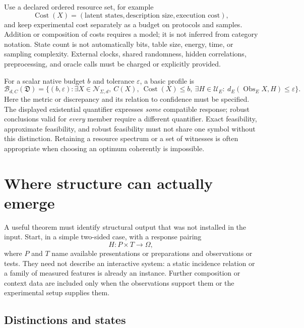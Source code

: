\documentclass[11pt]{article}
\theoremstyle{remark}
\newcommand{\Obs}{\operatorname{Obs}}
\newcommand{\Cost}{\operatorname{Cost}}
\newcommand{\calN}{\mathcal N}
\newcommand{\calU}{\mathcal U}
\begin{document}
Use a declared ordered resource set, for example
\[
 \Cost(X)=(\text{latent states},\text{description size},\text{execution cost}),
\]
and keep experimental cost separately as a budget on protocols and samples. Addition or composition of costs requires a model; it is not inferred from category notation. State count is not automatically bits, table size, energy, time, or sampling complexity. External clocks, shared randomness, hidden correlations, preprocessing, and oracle calls must be charged or explicitly provided.

For a scalar native budget $b$ and tolerance $\varepsilon$, a basic profile is
\begin{equation}
 \mathscr B_{d,C}(\mathfrak D)
 =\{(b,\varepsilon):\exists X\in\calN_{\Sigma,d},\ C(X),\
 \Cost(X)\leq b,\ \exists H\in\calU_E:\ d_E(\Obs_E X,H)\leq\varepsilon\}.
 \label{eq:budget-profile}
\end{equation}
Here the metric or discrepancy and its relation to confidence must be specified. The displayed existential quantifier expresses \emph{some} compatible response; robust conclusions valid for \emph{every} member require a different quantifier. Exact feasibility, approximate feasibility, and robust feasibility must not share one symbol without this distinction. Retaining a resource spectrum or a set of witnesses is often appropriate when choosing an optimum coherently is impossible.

\section{Where structure can actually emerge}
\label{sec:emergence}

A useful theorem must identify structural output that was not installed in the input. Start, in a simple two-sided case, with a response pairing
\begin{equation}
 H:P\times T\longrightarrow\Omega,
 \label{eq:pairing}
\end{equation}
where $P$ and $T$ name available presentations or preparations and observations or tests. They need not describe an interactive system: a static incidence relation or a family of measured features is already an instance. Further composition or context data are included only when the observations support them or the experimental setup supplies them.

\subsection{Distinctions and states}
\end{document}
